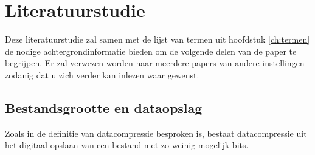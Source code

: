 \chapter{Literatuurstudie}
\label{ch:literatuurstudie}


Deze literatuurstudie zal samen met de lijst van termen uit hoofdstuk \ref{ch:termen} de nodige achtergrondinformatie bieden om de volgende delen van de paper te begrijpen. Er zal verwezen worden naar meerdere papers van andere instellingen zodanig dat u zich verder kan inlezen waar gewenst.







\section{Bestandsgrootte en dataopslag}
\label{sec:bestandsgrootte-dataopslag}
Zoals in de definitie van \gls{datacompressie} besproken is, bestaat \gls{datacompressie} uit het digitaal opslaan van een bestand met zo weinig mogelijk \glspl{bit}.

